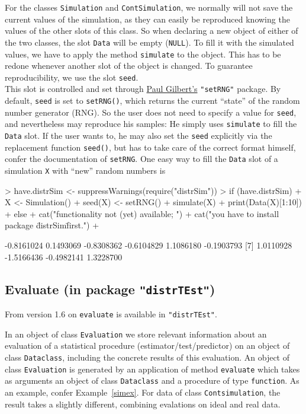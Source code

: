 \documentclass[11pt]{article}
\newcommand{\code}[1]{{\tt #1}}
\newcommand{\pkg}[1]{{\tt "#1"}}
\begin{document}
For the classes \code{Simulation} and \code{ContSimulation}, we normally will
not save the current values of the simulation, as they can easily be reproduced
knowing the values of the other slots of this class.
%
So when declaring a new object of either of the two classes, the slot 
\code{Data} will be empty (\code{NULL}).
To fill it with the simulated values, we have to apply the method 
\code{simulate} to the object. This has to be redone whenever another slot of 
the object is changed.
%
To guarantee reproducibility, we use the slot \code{seed}.\\
%
This slot is controlled and set through 
\href{mailto:pgilbert@bank-banque-canada.ca}{Paul Gilbert's} \pkg{setRNG} 
package.
By default, \code{seed} is set to \code{setRNG()}, which returns the current 
``state'' of the random number generator (RNG). So the user does not need to 
specify a value for \code{seed}, and nevertheless may reproduce his samples: 
He simply uses \code{simulate} to fill the \code{Data} slot.
If the user wants to, he may also set the \code{seed} explicitly via the 
replacement function \code{seed()}, but has to take care of the correct format 
himself, confer the documentation of \code{setRNG}. One easy way to fill 
the \code{Data} slot of a simulation \code{X} with ``new'' random numbers is
\begin{Schunk}
\begin{Sinput}
> have.distrSim <- suppressWarnings(require("distrSim"))
> if (have.distrSim)
+    {X <- Simulation()
+     seed(X) <- setRNG()
+     simulate(X)
+     print(Data(X)[1:10])
+    } else { 
+     cat("\n functionality not (yet) available; ")
+     cat("you have to install package \"distrSim\" first.\n")
+     }
\end{Sinput}
\begin{Soutput}
 [1] -0.8161024  0.1493069 -0.8308362 -0.6104829  1.1086180 -0.1903793
 [7]  1.0110928 -1.5166436 -0.4982141  1.3228700
\end{Soutput}
\end{Schunk}
%
\subsection[Evaluate (in package distrTEst)]%
{Evaluate (in package \pkg{distrTEst})}\label{evaluate}
%
From version 1.6 on \code{evaluate} is available in  \pkg{distrTEst}.

In an object of class \code{Evaluation}  we store relevant information
about an evaluation of a statistical procedure (estimator/test/predictor)
on an object of class \code{Dataclass}, including the concrete results of
this evaluation. An object of class \code{Evaluation}  is generated by an 
application of method \code{evaluate} which takes as arguments an object of 
class  \code{Dataclass} and a procedure of type \code{function}. As an example, 
confer Example~\ref{simex}.
For data of class \code{Contsimulation}, the result takes a slightly different,
combining evalations on ideal and real data.
%
\end{document}
